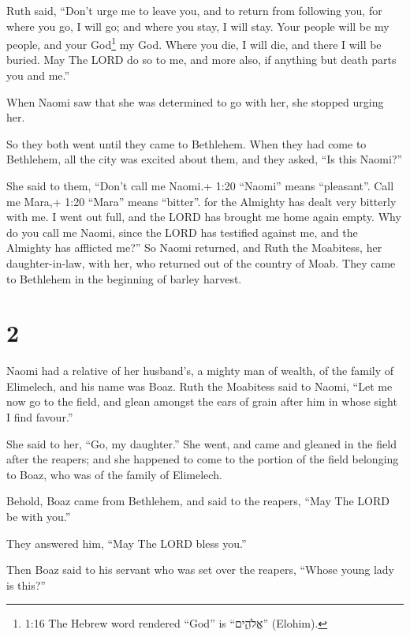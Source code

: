  Ruth said, ``Don't urge me to leave you, and to return
from following you, for where you go, I will go; and where you stay, I
will stay. Your people will be my people, and your God\footnote{1:16 The
  Hebrew word rendered ``God'' is ``אֱלֹהִ֑ים'' (Elohim).} my God.
 Where you die, I will die, and there I will be buried. May
The LORD do so to me, and more also, if anything but death parts you and
me.''

 When Naomi saw that she was determined to go with her, she
stopped urging her.

 So they both went until they came to Bethlehem. When they
had come to Bethlehem, all the city was excited about them, and they
asked, ``Is this Naomi?''

 She said to them, ``Don't call me Naomi.+ 1:20 ``Naomi''
means ``pleasant''. Call me Mara,+ 1:20 ``Mara'' means ``bitter''. for
the Almighty has dealt very bitterly with me.  I went out
full, and the LORD has brought me home again empty. Why do you call me
Naomi, since the LORD has testified against me, and the Almighty has
afflicted me?''  So Naomi returned, and Ruth the Moabitess,
her daughter-in-law, with her, who returned out of the country of Moab.
They came to Bethlehem in the beginning of barley harvest.

\hypertarget{section-1}{%
\section{2}\label{section-1}}

 Naomi had a relative of her husband's, a mighty man of
wealth, of the family of Elimelech, and his name was Boaz. 
Ruth the Moabitess said to Naomi, ``Let me now go to the field, and
glean amongst the ears of grain after him in whose sight I find
favour.''

She said to her, ``Go, my daughter.''  She went, and came
and gleaned in the field after the reapers; and she happened to come to
the portion of the field belonging to Boaz, who was of the family of
Elimelech.

 Behold, Boaz came from Bethlehem, and said to the reapers,
``May The LORD be with you.''

They answered him, ``May The LORD bless you.''

 Then Boaz said to his servant who was set over the reapers,
``Whose young lady is this?''

